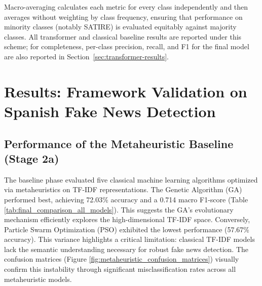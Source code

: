 \documentclass[informatics,article,accept,pdftex,moreauthors]{Definitions/mdpi}
\begin{document}
Macro-averaging calculates each metric for every class independently and then averages without weighting by class frequency, ensuring that performance on minority classes (notably SATIRE) is evaluated equitably against majority classes. All transformer and classical baseline results are reported under this scheme; for completeness, per-class precision, recall, and F1 for the final model are also reported in Section~\ref{sec:transformer-results}.


\section{Results: Framework Validation on Spanish Fake News Detection}

\subsection{Performance of the Metaheuristic Baseline (Stage 2a)}
The baseline phase evaluated five classical machine learning algorithms optimized via metaheuristics on TF-IDF representations. The Genetic Algorithm (GA) performed best, achieving 72.03\% accuracy and a 0.714 macro F1-score (Table \ref{tab:final_comparison_all_models}). This suggests the GA's evolutionary mechanism efficiently explores the high-dimensional TF-IDF space. Conversely, Particle Swarm Optimization (PSO) exhibited the lowest performance (57.67\% accuracy). This variance highlights a critical limitation: classical TF-IDF models lack the semantic understanding necessary for robust fake news detection. The confusion matrices (Figure \ref{fig:metaheuristic_confusion_matrices}) visually confirm this instability through significant misclassification rates across all metaheuristic models.
\end{document}
